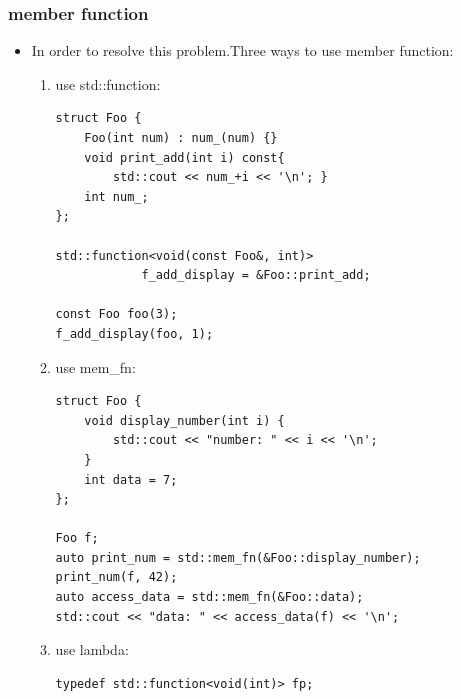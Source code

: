 \documentclass[a4paper,11pt,twoside]{book}
\begin{document}
\subsubsection{member function}
\begin{itemize}
	If you called for\_each() with \texttt{\&Item::Foo}, the code try to call \texttt{(\&Item::Foo)(x)}, which is ill-formed since for pointers to members you have to write \texttt{(x.*\&Item::Foo)()}. It's that syntactical difference that mem\_fn is meant to solve: mem\_fn deals with the invocation syntax of pointers to members so that you can use all the algorithms with pointers to members as well as functions and function objects. You cannot have \texttt{for\_each(v.begin(), v.end(), \&Item::Foo)} but you can have \texttt{for\_each(v.begin(), v.end(), mem\_fn(\&Item::Foo))}.
\begin{lstlisting}
template<class InputIt, class UnaryFunction>
UnaryFunction for_each(InputIt first, 
	InputIt last, UnaryFunction f){
		
	for (; first != last; ++first) {
		f(*first); // <== N.B. f(*first)
	}
}
\end{lstlisting}
	\item In order to resolve this problem.Three ways to use member function:
	\begin{enumerate}
		\item use std::function:
\begin{lstlisting}[numbers=none]
struct Foo {
	Foo(int num) : num_(num) {}
	void print_add(int i) const{
		std::cout << num_+i << '\n'; }
	int num_;
};

std::function<void(const Foo&, int)> 
			f_add_display = &Foo::print_add;
			
const Foo foo(3);
f_add_display(foo, 1); 
\end{lstlisting}

	\item use mem\_fn:
\begin{lstlisting}[numbers=none]
struct Foo {
	void display_number(int i) {
		std::cout << "number: " << i << '\n';
	}
	int data = 7;
};

Foo f;
auto print_num = std::mem_fn(&Foo::display_number);
print_num(f, 42);
auto access_data = std::mem_fn(&Foo::data);
std::cout << "data: " << access_data(f) << '\n';
\end{lstlisting}

	\item use lambda:
\begin{lstlisting}[numbers=none]
typedef std::function<void(int)> fp;


\end{lstlisting}
\end{enumerate}
\end{itemize}
\end{document}
